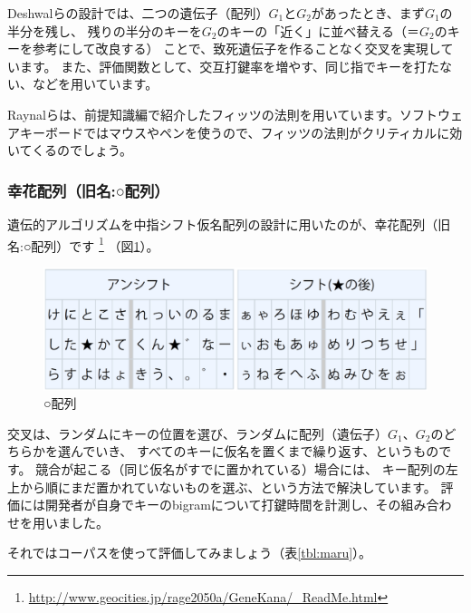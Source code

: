 Deshwalらの設計では、二つの遺伝子（配列）$G_1$と$G_2$があったとき、まず$G_1$の半分を残し、
残りの半分のキーを$G_2$のキーの「近く」に並べ替える（＝$G_2$のキーを参考にして改良する）
ことで、致死遺伝子を作ることなく交叉を実現しています。
また、評価関数として、交互打鍵率を増やす、同じ指でキーを打たない、などを用いています。

Raynalらは、前提知識編で紹介したフィッツの法則を用いています。ソフトウェアキーボードではマウスやペンを使うので、フィッツの法則がクリティカルに効いてくるのでしょう。

\subsubsection*{幸花配列（旧名:○配列）}

遺伝的アルゴリズムを中指シフト仮名配列の設計に用いたのが、幸花配列（旧名:○配列）です%
\footnote{\url{http://www.geocities.jp/rage2050a/GeneKana/_ReadMe.html}}%
（図\ref{fig:maru}）。

\begin{figure}[htbp]
 \begin{center}
  \includegraphics[width=0.8\hsize]{maru.eps}
 \end{center}
 \caption{○配列}
 \label{fig:maru}
\end{figure}

交叉は、ランダムにキーの位置を選び、ランダムに配列（遺伝子）$G_1$、$G_2$のどちらかを選んでいき、
すべてのキーに仮名を置くまで繰り返す、というものです。
競合が起こる（同じ仮名がすでに置かれている）場合には、
キー配列の左上から順にまだ置かれていないものを選ぶ、という方法で解決しています。
評価には開発者が自身でキーのbigramについて打鍵時間を計測し、その組み合わせを用いました。

それではコーパスを使って評価してみましょう（表\ref{tbl:maru}）。

